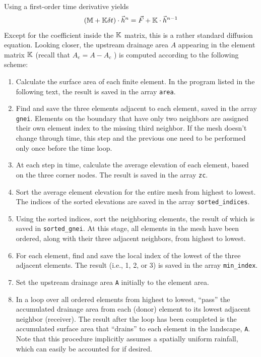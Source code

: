 Using a first-order time derivative yields
\[
({\mathbb{M}}  + {\mathbb{K}} \delta t ) \cdot \vec{h}^n = \vec{F}  + {\mathbb{K}} \cdot \vec{h}^{n-1}
\]
Except for the coefficient inside the ${\mathbb{K}}$ matrix, this is a rather standard diffusion equation. 
Looking closer, the upstream drainage area $A$ appearing in the element matrix ${\mathbb{K}}$ 
(recall that $A_e = A - A_c$ ) is computed according to the following scheme:
\begin{enumerate}
\item Calculate the surface area of each finite element. In the program listed in the following text, the
result is saved in the array {\tt area}.
\item Find and save the three elements adjacent to each element, 
saved in the array {\tt gnei}. 
Elements on the boundary that have only two neighbors are assigned their own element index to the missing
third neighbor. If the mesh doesn't change through time, this step and the previous one need to
be performed only once before the time loop.
\item  At each step in time, calculate the average elevation of each element, based on the three corner
nodes. The result is saved in the array {\tt zc}.
\item Sort the average element elevation for the entire mesh from highest to lowest. The indices of the
sorted elevations are saved in the array {\tt sorted\_indices}.
\item Using the sorted indices, sort the neighboring elements, the result of which is saved in
{\tt sorted\_gnei}. At this stage, all elements in the mesh have been ordered, along with their three
adjacent neighbors, from highest to lowest.
\item For each element, find and save the local index of the lowest of the three adjacent elements. The
result (i.e., 1, 2, or 3) is saved in the array {\tt min\_index}.
\item Set the upstream drainage area {\tt A} initially to the element area.
\item In a loop over all ordered elements from highest to lowest, ``pass'' the accumulated drainage area
from each (donor) element to its lowest adjacent neighbor (receiver). The result after the loop has
been completed is the accumulated surface area that ``drains'' to each element in the landscape, {\tt A}. 
Note that this procedure implicitly assumes a spatially uniform rainfall, which can easily be
accounted for if desired.

\end{enumerate}

